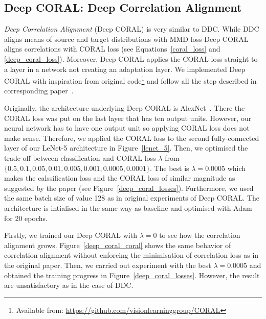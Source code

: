 \subsection{Deep CORAL: Deep Correlation Alignment}

\textit{Deep Correlation Alignment} (Deep CORAL) is very similar to DDC.
While DDC aligns means of source and target distributions with MMD loss
Deep CORAL aligns correlations with CORAL loss
(see Equations~\ref{coral_loss} and \ref{deep_coral_loss}).
Moreover, Deep CORAL applies the CORAL loss straight to a layer in a network
not creating an adaptation layer.
We implemented Deep CORAL with inspiration from original
code\footnote{Available from: \url{https://github.com/visionlearninggroup/CORAL}}
and follow all the step described in corresponding paper~\cite{sun2016}.

Originally, the architecture underlying Deep CORAL is AlexNet~\cite{krizhevsky2012}.
There the CORAL loss was put on the last layer that has ten output units.
However, our neural network has to have one output unit
so applying CORAL loss does not make sense.
Therefore, we applied the CORAL loss to the second fully-connected layer
of our LeNet-5 architecture in Figure~\ref{lenet_5}.
Then, we optimised the trade-off between classification and CORAL loss
\(\lambda\) from \(\{0.5, 0.1, 0.05, 0.01, 0.005, 0.001, 0.0005, 0.0001\}\).
The best is \(\lambda = 0.0005\) which makes the calssification loss
and the CORAL loss of similar magnitude as suggested by the paper
(see Figure~\ref{deep_coral_losses}).
Furthermore, we used the same batch size of value 128
as in original experiments of Deep CORAL.
The architecture is intialised in the same way as baseline
and optimised with Adam for 20 epochs.

Firstly, we trained our Deep CORAL with \(\lambda = 0\) to see
how the correlation alignment grows.
Figure~\ref{deep_coral_coral} shows the same behavior of correlation alignment
without enforcing the minimisation of correlation loss as in the original paper.
Then, we carried out experiment with the best \(\lambda = 0.0005\)
and obtained the training progress in Figure~\ref{deep_coral_losses}.
However, the result are unsatisfactory as in the case of DDC.

